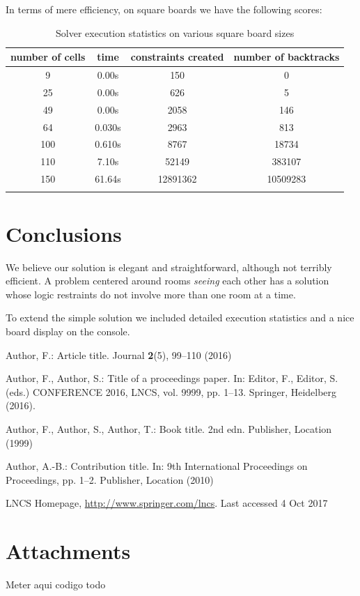 \documentclass[runningheads]{llncs}
\begin{document}
In terms of mere efficiency, on square boards we have the following scores:

\begin{table}[hbtp]
\centering
\begin{tabular}{cccc}
\toprule
number of cells & time   & constraints created & number of backtracks \\
\midrule
9               & 0.00s  & 150                 & 0                    \\
25              & 0.00s  & 626                 & 5                    \\
49              & 0.00s  & 2058                & 146                  \\
64              & 0.030s & 2963                & 813                  \\
100             & 0.610s & 8767                & 18734                \\
110             & 7.10s  & 52149               & 383107               \\
150             & 61.64s & 12891362            & 10509283             \\
\bottomrule\\
\end{tabular}
\caption{Solver execution statistics on various square board sizes}
\label{tab:time}
\end{table}

\section{Conclusions}
\label{sec:conclusions}

We believe our solution is elegant and straightforward, although not terribly efficient. A problem centered around rooms \textsl{seeing} each other has a solution whose logic restraints do not involve more than one room at a time.

To extend the simple solution we included detailed execution statistics and a nice board display on the console.

%
%
%
% 
% 
%
\begin{thebibliography}{8}
	Author, F.: Article title. Journal \textbf{2}(5), 99--110 (2016)
	
	Author, F., Author, S.: Title of a proceedings paper. In: Editor,
	F., Editor, S. (eds.) CONFERENCE 2016, LNCS, vol. 9999, pp. 1--13.
	Springer, Heidelberg (2016). 
	
	Author, F., Author, S., Author, T.: Book title. 2nd edn. Publisher,
	Location (1999)
	
	Author, A.-B.: Contribution title. In: 9th International Proceedings
	on Proceedings, pp. 1--2. Publisher, Location (2010)
	
	LNCS Homepage, \url{http://www.springer.com/lncs}. Last accessed 4
	Oct 2017
\end{thebibliography}

\newpage

\section{Attachments}
\label{sec:attachments}
Meter aqui codigo todo
\end{document}
